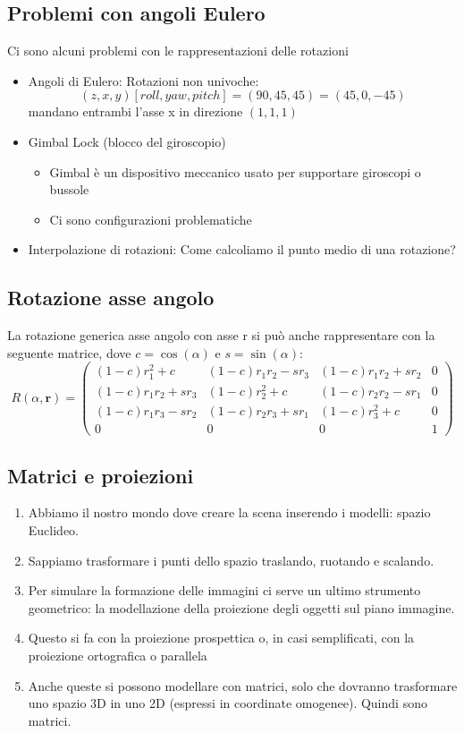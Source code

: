 \documentclass[a4paper, 10pt]{article}
\renewcommand{\vec}{\bm}
\begin{document}
	\subsection{Problemi con angoli Eulero}
			Ci sono alcuni problemi con le rappresentazioni
			delle rotazioni
			\begin{itemize}
				\item Angoli di Eulero:
					Rotazioni non univoche:
					\[
						(z, x, y) [roll, yaw, pitch] = (90, 45, 45) = (45, 0, -45)
					\]
					mandano entrambi l'asse x in direzione $ (1, 1, 1) $
				\item Gimbal Lock (blocco del giroscopio)
				\begin{itemize}
					\item Gimbal è un dispositivo meccanico usato per
				supportare giroscopi o bussole
					\item Ci sono configurazioni problematiche
				\end{itemize}
				\item Interpolazione di rotazioni: Come calcoliamo il punto medio di una rotazione?
			\end{itemize}
	\subsection{Rotazione asse angolo}
		La rotazione generica asse angolo con asse r si può anche
		rappresentare con la seguente matrice, dove 
		$ c = \cos(\alpha) $ e $ s = \sin(\alpha) $:
		\[
			R(\alpha,\vec{r}) =
			\begin{pmatrix}
				(1-c)r^2_1 + c & (1-c)r_1 r_2 -s r_3 & (1-c) r_1 r_2 + s r_2 & 0 \\
				(1-c)r_1 r_2 + s r_3  & (1-c)r^2_2 +c & (1-c)r_2 r_2 -s r_1 & 0 \\
				(1-c)r_1 r_3 -sr_2 & (1-c) r_2 r_3 + s r_1 & (1-c)r^2_3 +c & 0 \\
				0 & 0 & 0 & 1 
			\end{pmatrix}
		\]
	\subsection{Matrici e proiezioni}
		\begin{enumerate}[label=\textbullet]
			\item Abbiamo il nostro mondo dove creare la scena inserendo i
		modelli: spazio Euclideo.
			\item Sappiamo trasformare i punti dello spazio traslando, ruotando
		e scalando.
			\item Per simulare la formazione delle immagini ci serve un ultimo
		strumento geometrico: la modellazione della proiezione degli
		oggetti sul piano immagine.
			\item Questo si fa con la proiezione prospettica o, in casi
		semplificati, con la proiezione ortografica o parallela
			\item Anche queste si possono modellare con matrici, solo che
		dovranno trasformare uno spazio 3D in uno 2D (espressi in
		coordinate omogenee). Quindi sono matrici.
		\end{enumerate}
\end{document}
